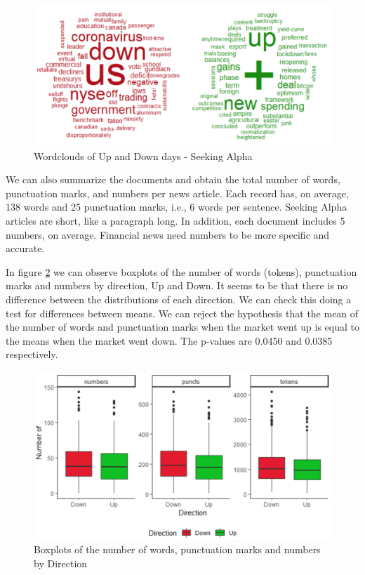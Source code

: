 \documentclass[a4paper, 12pt]{report}
\begin{document}
    \begin{figure}[H]
    \centering
    \includegraphics[width=14cm]{graphs/Seeking_Alpha/wordclouds_v2.png}
    \caption{Wordclouds of Up and Down days - Seeking Alpha}
    \label{Fig:wordclouds_v2}
    \end{figure}
    
    
    We can also summarize the documents and obtain the total number of words, punctuation marks, and numbers per news article. Each record has, on average, 138 words and 25 punctuation marks, i.e., 6 words per sentence. Seeking Alpha articles are short, like a paragraph long. In addition, each document includes 5 numbers, on average. Financial news need numbers to be more specific and accurate.
    
    In figure \ref{Fig:Boxplot_stats} we can observe boxplots of the number of words (tokens), punctuation marks and numbers by direction, Up and Down. It seems to be that there is no difference between the distributions of each direction. We can check this doing a test for differences between means. We can reject the hypothesis that the mean of the number of words and punctuation marks when the market went up is equal to the means when the market went down. The p-values are 0.0450 and 0.0385 respectively.  

    \begin{figure}[H]
    \centering
    \includegraphics[scale=0.7]{graphs/Seeking_Alpha/Boxplot_stats.png}
    \caption{Boxplots of the number of words, punctuation marks and numbers by Direction}
    \label{Fig:Boxplot_stats}
    \end{figure}
    
\end{document}
